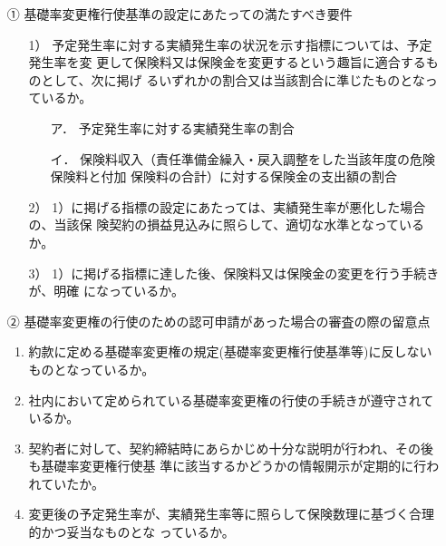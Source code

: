 \documentclass[report,gutter=10mm,fore-edge=10mm,uplatex,dvipdfmx]{jlreq}
\begin{document}

\begin{itemize}
 \item [①]基礎率変更権行使基準の設定にあたっての満たすべき要件
\begin{enumerate}
 \item [1）]予定発生率に対する実績発生率の状況を示す指標については、予定発生率を変
更して保険料又は保険金を変更するという趣旨に適合するものとして、次に掲げ
るいずれかの割合又は当該割合に準じたものとなっているか。
\begin{itemize}
 \item [ア．]予定発生率に対する実績発生率の割合
 \item [イ．]保険料収入（責任準備金繰入・戻入調整をした当該年度の危険保険料と付加
保険料の合計）に対する保険金の支出額の割合
\end{itemize}
 \item [2）]1）に掲げる指標の設定にあたっては、実績発生率が悪化した場合の、当該保
険契約の損益見込みに照らして、適切な水準となっているか。
 \item [3）]1）に掲げる指標に達した後、保険料又は保険金の変更を行う手続きが、明確
になっているか。
\end{enumerate}
 \item [②]基礎率変更権の行使のための認可申請があった場合の審査の際の留意点
\begin{enumerate}
 \item 約款に定める基礎率変更権の規定(基礎率変更権行使基準等)に反しないものとなっているか。
 \item 社内において定められている基礎率変更権の行使の手続きが遵守されているか。
 \item  契約者に対して、契約締結時にあらかじめ十分な説明が行われ、その後も基礎率変更権行使基
 準に該当するかどうかの情報開示が定期的に行われていたか。
 \item  変更後の予定発生率が、実績発生率等に照らして保険数理に基づく合理的かつ妥当なものとな
っているか。
\end{enumerate}
\end{itemize}
\end{document}
